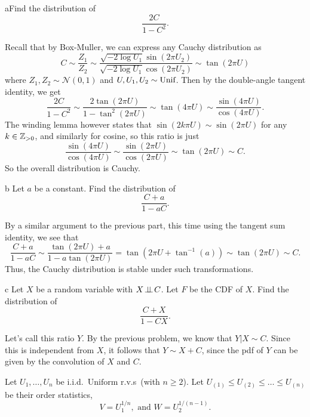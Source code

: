 \documentclass{pset}
\begin{document}
\begin{parts}
\begin{part}{a}Find the distribution of
$$ \frac{2C}{1-C^2}.$$
\end{part}

Recall that by Box-Muller, we can express any Cauchy distribution as
\[
  C \sim \frac{Z_1}{Z_2} \sim \frac{\sqrt{-2\log U_1}\sin(2\pi U_2)}{\sqrt{-2\log U_1}\cos(2\pi U_2)} \sim \tan(2\pi U)
\]
where $Z_1,Z_2\sim \mathcal{N}(0,1)$ and $U,U_1,U_2\sim \textrm{Unif}$. Then by the double-angle tangent identity, we get
\[
  \frac{2C}{1-C^2} \sim \frac{2\tan(2\pi U)}{1-\tan^2(2\pi U)} \sim \tan(4\pi U) \sim \frac{\sin(4\pi U)}{\cos(4\pi U)}.
\]
The winding lemma however states that $\sin(2k\pi U) \sim \sin(2\pi U)$ for any $k\in \mathbb{Z}_{>0}$, and similarly for cosine, so this ratio is just
\[
  \frac{\sin(4\pi U)}{\cos(4\pi U)} \sim \frac{\sin(2\pi U)}{\cos(2\pi U)} \sim \tan(2\pi U) \sim C.
\]
So the overall distribution is Cauchy.

\begin{part}{b}
Let $a$ be a constant. Find the distribution of 
$$ \frac{C+a}{1-aC}.$$
\end{part}

By a similar argument to the previous part, this time using the tangent sum identity, we see that
\[
  \frac{C+a}{1-aC} \sim \frac{\tan(2\pi U) + a}{1-a\tan(2\pi U)} = \tan(2\pi U + \tan^{-1}(a)) \sim \tan(2\pi U) \sim C.
\]
Thus, the Cauchy distribution is stable under such transformations.

\begin{part}{c} Let $X$ be a random variable with $X \!\perp\!\!\!\perp\! C$. Let $F$ be the CDF of $X$. Find the distribution of 
$$ \frac{C+X}{1-CX}.$$
\end{part}

Let's call this ratio $Y$. By the previous problem, we know that $Y|X\sim C$. Since this is independent from $X$, it follows that $Y\sim X+C$, since the pdf of $Y$ can be given by the convolution of $X$ and $C$.
\end{parts}

\begin{problem}{3} 
  Let $U_1,\dots,U_n$ be i.i.d.~$\textrm{Uniform}$ r.v.s~(with $n \geq 2$). Let $U_{(1)} \leq U_{(2)} \leq \dots \leq U_{(n)}$ be their order statistics,
$$V = U_1^{1/n}, \textrm{ and } W =  U_2^{1/(n-1)}.$$
\end{problem}
\end{document}
